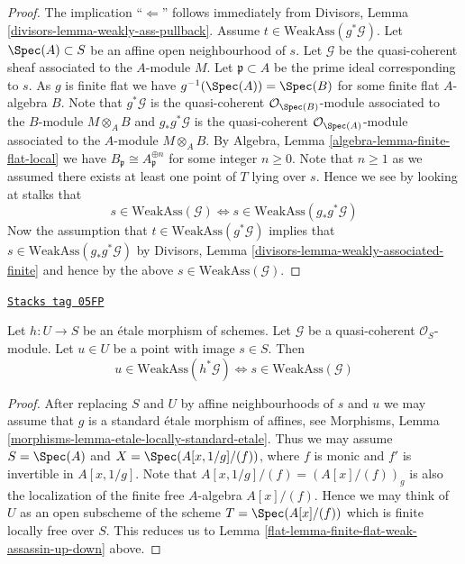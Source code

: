 \begin{proof}
The implication ``$\Leftarrow$'' follows immediately from
Divisors, Lemma \ref{divisors-lemma-weakly-ass-pullback}.
Assume $t \in \text{WeakAss}(g^*\mathcal{G})$.
Let $\Spec(A) \subset S$ be an affine open neighbourhood of $s$.
Let $\mathcal{G}$ be the quasi-coherent sheaf associated to the $A$-module $M$.
Let $\mathfrak p \subset A$ be the prime ideal corresponding to $s$.
As $g$ is finite flat we have $g^{-1}(\Spec(A)) = \Spec(B)$
for some finite flat $A$-algebra $B$. Note that
$g^*\mathcal{G}$ is the quasi-coherent $\mathcal{O}_{\Spec(B)}$-module
associated to the $B$-module $M \otimes_A B$ and $g_*g^*\mathcal{G}$ is the
quasi-coherent $\mathcal{O}_{\Spec(A)}$-module associated to the
$A$-module $M \otimes_A B$. By
Algebra, Lemma \ref{algebra-lemma-finite-flat-local}
we have $B_{\mathfrak p} \cong A_{\mathfrak p}^{\oplus n}$
for some integer $n \geq 0$. Note that $n \geq 1$ as we assumed there
exists at least one point of $T$ lying over $s$. Hence we see by
looking at stalks that
$$
s \in \text{WeakAss}(\mathcal{G})
\Leftrightarrow
s \in \text{WeakAss}(g_*g^*\mathcal{G})
$$
Now the assumption that $t \in \text{WeakAss}(g^*\mathcal{G})$
implies that $s \in \text{WeakAss}(g_*g^*\mathcal{G})$ by
Divisors, Lemma \ref{divisors-lemma-weakly-associated-finite}
and hence by the above $s \in  \text{WeakAss}(\mathcal{G})$.
\end{proof}

\begin{lemma}
\label{flat-lemma-etale-weak-assassin-up-down}
\href{https://stacks.math.columbia.edu/tag/05FP}{\texttt{Stacks tag 05FP}}

Let $h : U \to S$ be an \'etale morphism of schemes.
Let $\mathcal{G}$ be a quasi-coherent $\mathcal{O}_S$-module.
Let $u \in U$ be a point with image $s \in S$. Then
$$
u \in \text{WeakAss}(h^*\mathcal{G})
\Leftrightarrow
s \in \text{WeakAss}(\mathcal{G})
$$
\end{lemma}

\begin{proof}

After replacing $S$ and $U$ by affine neighbourhoods of $s$ and $u$
we may assume that $g$ is a standard \'etale morphism of affines, see
Morphisms, Lemma \ref{morphisms-lemma-etale-locally-standard-etale}.
Thus we may assume $S = \Spec(A)$ and
$X = \Spec(A[x, 1/g]/(f))$, where $f$ is monic and $f'$
is invertible in $A[x, 1/g]$.
Note that $A[x, 1/g]/(f) = (A[x]/(f))_g$ is also the localization
of the finite free $A$-algebra $A[x]/(f)$. Hence we may think of
$U$ as an open subscheme of the scheme $T = \Spec(A[x]/(f))$
which is finite locally free over $S$. This reduces us to
Lemma \ref{flat-lemma-finite-flat-weak-assassin-up-down}
above.
\end{proof}

